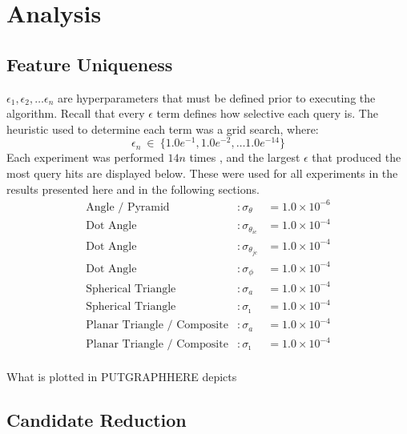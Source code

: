 \section{Analysis}\label{sec:analysis}

\subsection{Feature Uniqueness}\label{subsec:featureUniquenessAnalysis}
$\epsilon_1, \epsilon_2, \ldots \epsilon_n$ are hyperparameters that must be defined prior to executing the algorithm.
Recall that every $\epsilon$ term defines how selective each query is.
The heuristic used to determine each term was a grid search, where:
\begin{equation}
    \label{eq:gridSearchEpsilon}
    \epsilon_n \ \in \ \{1.0e^{-1}, 1.0e^{-2}, \ldots 1.0e^{-14}\}
\end{equation}
Each experiment was performed $14n$ times , and the largest $\epsilon$ that produced the most query hits are displayed
below.
These were used for all experiments in the results presented here and in the following sections.
\begin{align*}
    \text{Angle / Pyramid}&: \sigma_\theta &= 1.0 \times 10^{-6}\\
    \text{Dot Angle}&: \sigma_{\theta_{ic}} &= 1.0 \times 10^{-4}\\
    \text{Dot Angle}&: \sigma_{\theta_{jc}} &= 1.0 \times 10^{-4}\\
    \text{Dot Angle}&: \sigma_\phi &= 1.0 \times 10^{-4} \\
    \text{Spherical Triangle}&: \sigma_a &= 1.0 \times 10^{-4}\\
    \text{Spherical Triangle}&: \sigma_\imath &= 1.0 \times 10^{-4}\\
    \text{Planar Triangle / Composite}&: \sigma_a &= 1.0 \times 10^{-4} \\
    \text{Planar Triangle / Composite}&: \sigma_\imath &= 1.0 \times 10^{-4}\\
\end{align*}

What is plotted in PUTGRAPHHERE depicts

\subsection{Candidate Reduction}\label{subsec:candidateReductionAnalysis}


